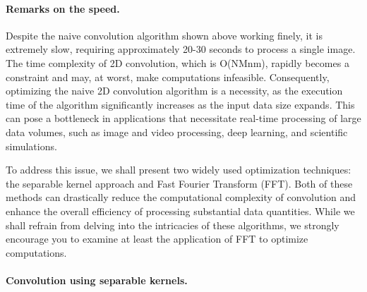 \documentclass[%
oneside,                 %
final,                   %
10pt]{article}
\begin{document}
\paragraph{Remarks on the speed.}
Despite the naive convolution algorithm shown above working finely, it
is extremely slow, requiring approximately 20-30 seconds to process a
single image. The time complexity of 2D convolution, which is O(NMnm),
rapidly becomes a constraint and may, at worst, make computations
infeasible. Consequently, optimizing the naive 2D convolution
algorithm is a necessity, as the execution time of the algorithm
significantly increases as the input data size expands. This can pose
a bottleneck in applications that necessitate real-time processing of
large data volumes, such as image and video processing, deep learning,
and scientific simulations.

To address this issue, we shall present two widely used optimization
techniques: the separable kernel approach and Fast Fourier Transform
(FFT). Both of these methods can drastically reduce the computational
complexity of convolution and enhance the overall efficiency of
processing substantial data quantities. While we shall refrain from
delving into the intricacies of these algorithms, we strongly
encourage you to examine at least the application of FFT to optimize
computations.

\paragraph{Convolution using separable kernels.}
\end{document}
